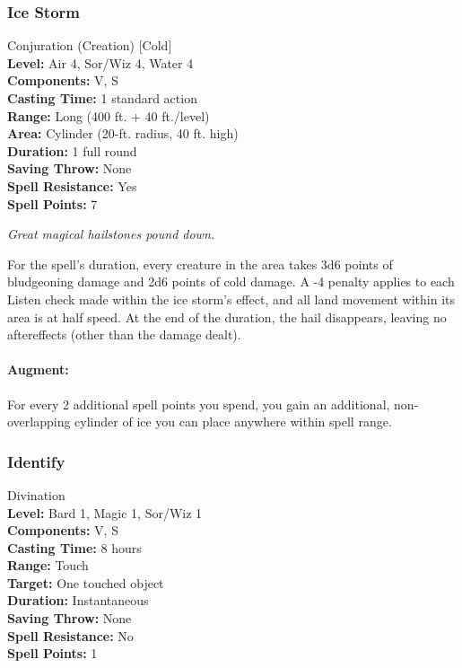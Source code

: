 \subsubsection{Ice Storm}
\label{Spell:IceStorm}
Conjuration (Creation) [Cold]
\\ \textbf{Level:} Air 4, Sor/Wiz 4, Water 4
\\ \textbf{Components:} V, S
\\ \textbf{Casting Time:} 1 standard action
\\ \textbf{Range:} Long (400 ft. + 40 ft./level)
\\ \textbf{Area:} Cylinder (20-ft. radius, 40 ft. high)
\\ \textbf{Duration:} 1 full round
\\ \textbf{Saving Throw:} None
\\ \textbf{Spell Resistance:} Yes
\\ \textbf{Spell Points:} 7

\emph{Great magical hailstones pound down.} 

For the spell's duration, every creature in the area takes 3d6 points of bludgeoning damage and 2d6 points of cold damage. 
A -4 penalty applies to each Listen check made within the ice storm's effect, and all land movement within its area is at half speed. 
At the end of the duration, the hail disappears, leaving no aftereffects (other than the damage dealt).

\paragraph{Augment:} For every 2 additional spell points you spend, you gain an additional, non-overlapping cylinder of ice you can place anywhere within spell range.
\subsubsection{Identify}
\label{Spell:Identify}
Divination
\\ \textbf{Level:} Bard 1, Magic 1, Sor/Wiz 1
\\ \textbf{Components:} V, S
\\ \textbf{Casting Time:} 8 hours
\\ \textbf{Range:} Touch
\\ \textbf{Target:} One touched object
\\ \textbf{Duration:} Instantaneous
\\ \textbf{Saving Throw:} None
\\ \textbf{Spell Resistance:} No
\\ \textbf{Spell Points:} 1

